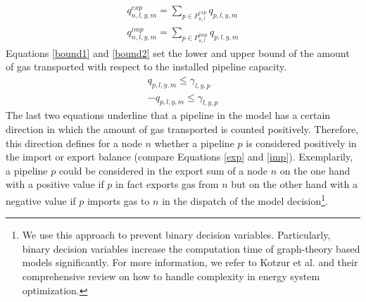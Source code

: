 \begin{align}
	q^{exp}_{n,l,y,m} = \sum_{p \in P^{exp}_{n,l}} q_{p,l,y,m} \label{exp}\\
	q^{imp}_{n,l,y,m} = \sum_{p \in P^{imp}_{n,l}} q_{p,l,y,m} \label{imp}
\end{align}
Equations \ref{bound1} and \ref{bound2} set the lower and upper bound of the amount of gas transported with respect to the installed pipeline capacity.
\begin{align}
	q_{p,l,y,m} \leq \gamma_{l, y, p} \label{bound1}\\
	-q_{p,l,y,m} \leq \gamma_{l, y, p} \label{bound2}
\end{align}
The last two equations underline that a pipeline in the model has a certain direction in which the amount of gas transported is counted positively. Therefore, this direction defines for a node $n$ whether a pipeline $p$ is considered positively in the import or export balance (compare Equations \ref{exp} and \ref{imp}). Exemplarily, a pipeline $p$ could be considered in the export sum of a node $n$ on the one hand with a positive value if $p$ in fact exports gas from $n$ but on the other hand with a negative value if $p$ imports gas to $n$ in the dispatch of the model decision\footnote{We use this approach to prevent binary decision variables. Particularly, binary decision variables increase the computation time of graph-theory based models significantly. For more information, we refer to Kotzur et al. \cite{kotzur2021modeler} and their comprehensive review on how to handle complexity in energy system optimization.}.\vspace{0.35cm}

